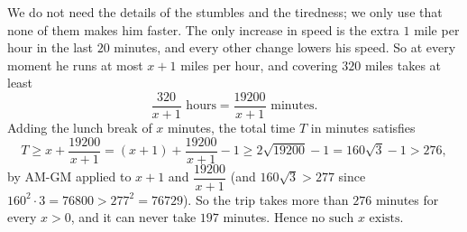 We do not need the details of the stumbles and the tiredness; we only use that none of them makes him faster. The only increase in speed is the extra $1$ mile per hour in the last $20$ minutes, and every other change lowers his speed. So at every moment he runs at most $x+1$ miles per hour, and covering $320$ miles takes at least
\[
\dfrac{320}{x+1}\text{ hours}=\dfrac{19200}{x+1}\text{ minutes}.
\]
Adding the lunch break of $x$ minutes, the total time $T$ in minutes satisfies
\[
T\ge x+\dfrac{19200}{x+1}=(x+1)+\dfrac{19200}{x+1}-1\ge2\sqrt{19200}-1=160\sqrt3-1>276,
\]
by AM-GM applied to $x+1$ and $\dfrac{19200}{x+1}$ (and $160\sqrt3>277$ since $160^2\cdot3=76800>277^2=76729$). So the trip takes more than $276$ minutes for every $x>0$, and it can never take $197$ minutes. Hence $\boxed{\text{no such } x \text{ exists}}$.
